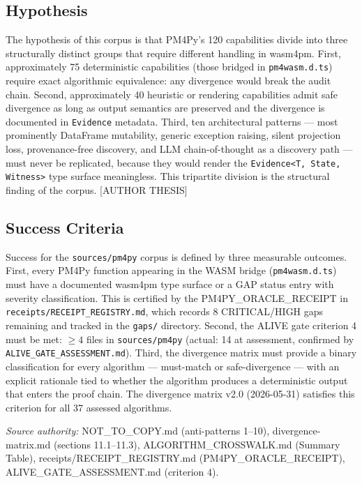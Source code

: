 \subsection{Hypothesis}
\label{sec:sources-pm4py-rq-hypothesis}

The hypothesis of this corpus is that PM4Py's 120 capabilities divide into three
structurally distinct groups that require different handling in wasm4pm. First, approximately
75 deterministic capabilities (those bridged in \texttt{pm4wasm.d.ts}) require exact
algorithmic equivalence: any divergence would break the audit chain. Second, approximately
40 heuristic or rendering capabilities admit safe divergence as long as output semantics
are preserved and the divergence is documented in \texttt{Evidence} metadata. Third,
ten architectural patterns --- most prominently DataFrame mutability, generic exception
raising, silent projection loss, provenance-free discovery, and LLM chain-of-thought
as a discovery path --- must never be replicated, because they would render the
\texttt{Evidence<T, State, Witness>} type surface meaningless. This tripartite division
is the structural finding of the corpus. [AUTHOR THESIS]

\subsection{Success Criteria}
\label{sec:sources-pm4py-rq-criteria}

Success for the \texttt{sources/pm4py} corpus is defined by three measurable outcomes.
First, every PM4Py function appearing in the WASM bridge (\texttt{pm4wasm.d.ts}) must
have a documented wasm4pm type surface or a GAP status entry with severity classification.
This is certified by the PM4PY\_ORACLE\_RECEIPT in \texttt{receipts/RECEIPT\_REGISTRY.md},
which records 8 CRITICAL/HIGH gaps remaining and tracked in the \texttt{gaps/} directory.
Second, the ALIVE gate criterion 4 must be met: $\geq 4$ files in \texttt{sources/pm4py}
(actual: 14 at assessment, confirmed by \texttt{ALIVE\_GATE\_ASSESSMENT.md}). Third, the
divergence matrix must provide a binary classification for every algorithm --- must-match
or safe-divergence --- with an explicit rationale tied to whether the algorithm produces a
deterministic output that enters the proof chain. The divergence matrix v2.0
(2026-05-31) satisfies this criterion for all 37 assessed algorithms.

\bigskip
\noindent\textit{Source authority:} NOT\_TO\_COPY.md (anti-patterns 1--10),
divergence-matrix.md (sections 11.1--11.3), ALGORITHM\_CROSSWALK.md (Summary Table),
receipts/RECEIPT\_REGISTRY.md (PM4PY\_ORACLE\_RECEIPT), ALIVE\_GATE\_ASSESSMENT.md
(criterion 4).
